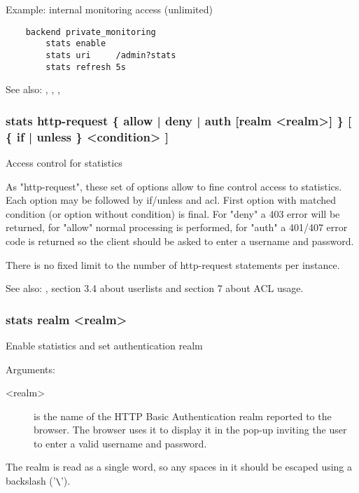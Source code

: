    Example: internal monitoring access (unlimited)
   \begin{verbatim}
    backend private_monitoring
        stats enable
        stats uri     /admin?stats
        stats refresh 5s
   \end{verbatim}

  See also: , , , 

\subsubsection[stats http-request]{stats http-request \{ allow | deny | auth [realm <realm>] \} [ \{ if | unless \} <condition> ]}


  Access control for statistics


  As "http-request", these set of options allow to fine control access to
  statistics. Each option may be followed by if/unless and acl.
  First option with matched condition (or option without condition) is final.
  For "deny" a 403 error will be returned, for "allow" normal processing is
  performed, for "auth" a 401/407 error code is returned so the client
  should be asked to enter a username and password.

  There is no fixed limit to the number of http-request statements per
  instance.

  See also: , section 3.4 about userlists and section 7
             about ACL usage.

\subsubsection[stats realm]{stats realm <realm>}

  Enable statistics and set authentication realm


  Arguments:
  \begin{description}
  \item[<realm>] is the name of the HTTP Basic Authentication realm reported to
              the browser. The browser uses it to display it in the pop-up
              inviting the user to enter a valid username and password.
  \end{description}

  The realm is read as a single word, so any spaces in it should be escaped
  using a backslash ('\verb|\|').

